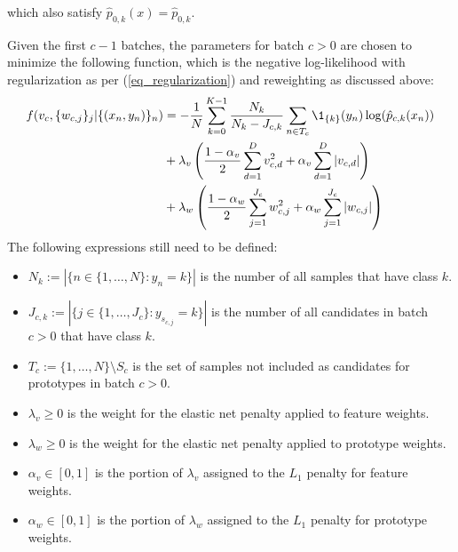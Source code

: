 %
which also satisfy $\hat{p}_{0,k}(x)=\hat{p}_{0,k}$.
%
\begin{center}\end{center}
%
\begin{center}\end{center}
%
Given the first $c-1$ batches, the parameters for batch $c>0$ are chosen to minimize the following function, which is the negative log-likelihood with regularization as per (\ref{eq_regularization}) and reweighting as discussed above:
%
\begin{align}
f(v_c,\{w_{c,j}\}_j|\{(x_n,y_n)\}_n)
&=-\frac{1}{N}\sum_{k=0}^{K-1}\frac{N_k}{N_k-J_{c,k}}\sum_{n\in T_c}
\1_{\{k\}}(y_n)\log(\hat{p}_{c,k}(x_n))\label{eq_nll_classifier}\\
&+\lambda_v\left(\frac{1-\alpha_v}{2}\sum_{d=1}^Dv_{c,d}^2
+\alpha_v\sum_{d=1}^D|v_{c,d}|\right)\notag\\
&+\lambda_w\left(\frac{1-\alpha_w}{2}\sum_{j=1}^{J_c}w_{c,j}^2
+\alpha_w\sum_{j=1}^{J_c}|w_{c,j}|\right)\notag
\end{align}
%
The following expressions still need to be defined:
%
\begin{itemize}
\item $N_k:=\left|\{n\in\{1,\dots,N\}:y_n=k\}\right|$ is the number of all samples that have class $k$.
%
\item $J_{c,k}:=\left|\{j\in\{1,\dots,J_c\}:y_{s_{c,j}}=k\}\right|$
is the number of all candidates in batch $c>0$ that have class $k$.
%
\item $T_c:=\{1,\dots,N\}\setminus S_c$ is the set of samples not included as candidates for prototypes in batch $c>0$.
%
\item $\lambda_v\geq0$ is the weight for the elastic net penalty applied to feature weights.
%
\item $\lambda_w\geq0$ is the weight for the elastic net penalty applied to prototype weights.
%
\item $\alpha_v\in[0,1]$ is the portion of $\lambda_v$ assigned to the $L_1$ penalty for feature weights.
%
\item $\alpha_w\in[0,1]$ is the portion of $\lambda_w$ assigned to the $L_1$ penalty for prototype weights.
\end{itemize}
